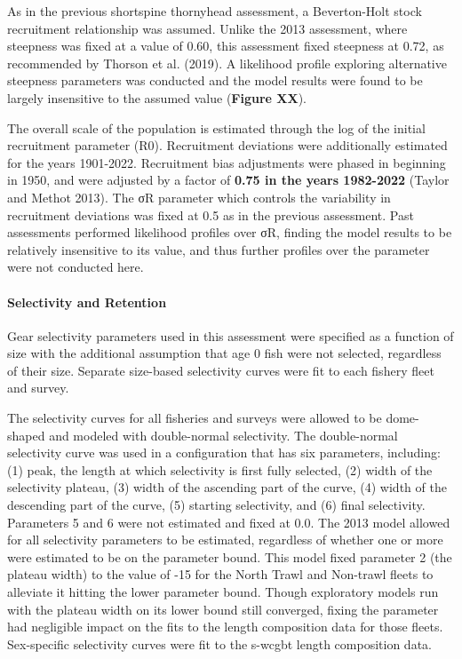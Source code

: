\documentclass[11pt,
  english,
  letterpaper,
]{article}
\begin{document}
As in the previous shortspine thornyhead assessment, a Beverton-Holt stock recruitment relationship was assumed. Unlike the 2013 assessment, where steepness was fixed at a value of 0.60, this assessment fixed steepness at 0.72, as recommended by Thorson et al. (2019). A likelihood profile exploring alternative steepness parameters was conducted and the model results were found to be largely insensitive to the assumed value (\textbf{Figure XX}).

The overall scale of the population is estimated through the log of the initial recruitment parameter (R0). Recruitment deviations were additionally estimated for the years 1901-2022. Recruitment bias adjustments were phased in beginning in 1950, and were adjusted by a factor of \textbf{0.75 in the years 1982-2022} (Taylor and Methot 2013). The σR parameter which controls the variability in recruitment deviations was fixed at 0.5 as in the previous assessment. Past assessments performed likelihood profiles over σR, finding the model results to be relatively insensitive to its value, and thus further profiles over the parameter were not conducted here.

\hypertarget{selectivity-and-retention}{%
\paragraph{Selectivity and Retention}\label{selectivity-and-retention}}

Gear selectivity parameters used in this assessment were specified as a function of size with the additional assumption that age 0 fish were not selected, regardless of their size. Separate size-based selectivity curves were fit to each fishery fleet and survey.

The selectivity curves for all fisheries and surveys were allowed to be dome-shaped and modeled with double-normal selectivity. The double-normal selectivity curve was used in a configuration that has six parameters, including: (1) peak, the length at which selectivity is first fully selected, (2) width of the selectivity plateau, (3) width of the ascending part of the curve, (4) width of the descending part of the curve, (5) starting selectivity, and (6) final selectivity. Parameters 5 and 6 were not estimated and fixed at 0.0. The 2013 model allowed for all selectivity parameters to be estimated, regardless of whether one or more were estimated to be on the parameter bound. This model fixed parameter 2 (the plateau width) to the value of -15 for the North Trawl and Non-trawl fleets to alleviate it hitting the lower parameter bound. Though exploratory models run with the plateau width on its lower bound still converged, fixing the parameter had negligible impact on the fits to the length composition data for those fleets. Sex-specific selectivity curves were fit to the \gls{s-wcgbt} length composition data.
\end{document}
